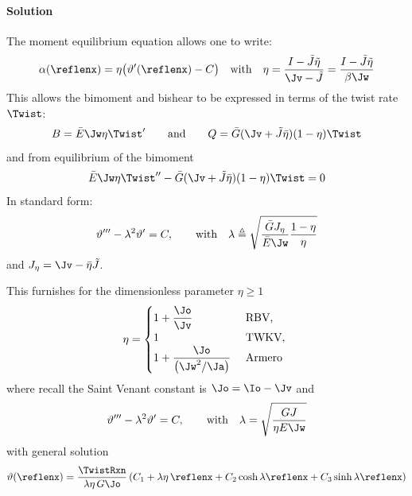 \paragraph{Solution}
The moment equilibrium equation allows one to write:
\begin{equation*}
    \alpha (\reflenx)= \eta \bigl(
     \vartheta^{\prime}(\reflenx) - C\bigr)
     \quad\text{with}\quad 
     \eta = \frac{I - \tilde{J}\tilde{\eta}}{\Jv - \tilde{J}} = \frac{I - \tilde{J}\tilde{\eta}}{\beta \Jw}
\end{equation*}
This allows the bimoment and bishear to be expressed in terms of the twist rate \(\Twist\):
\begin{equation*}
B = \bar{E}\Jw \eta \Twist' 
\qquad\text{and}\qquad
Q = \bar{G}(\Jv + \tilde{J}\bar{\eta})(1 - \eta) \Twist
\end{equation*}
and from equilibrium of the bimoment
\begin{equation}
\bar{E}\Jw \eta \Twist'' - \bar{G}(\Jv + \tilde{J}\bar{\eta})(1 - \eta) \Twist = 0
\end{equation}
%
In standard form:
\begin{equation*}
\vartheta''' - \lambda^2 \vartheta' = C,
\qquad\text{with}\quad
\lambda \triangleq \sqrt{\frac{\bar{G}J_{\eta}}{\bar{E}\Jw}\frac{1 - \eta}{\eta}}
\end{equation*}
and \(J_{\eta} = \Jv - \bar{\eta}\tilde{J}\). 
%


This furnishes for the dimensionless parameter $\eta \geq 1$ \citep{armero2022newa}
\begin{equation}
\eta = \begin{cases}
1+\dfrac{\Jo}{\Jv} & \text { RBV, } \\
1 & \text { TWKV, } \\ 
1+\dfrac{\Jo}{\left(\Jw^2 / \Ja \right)} & \text { Armero}\end{cases}
\end{equation}
where recall the Saint Venant constant is \(\Jo = \Io - \Jv\)
and
$$
\vartheta''' - \lambda^2 \vartheta' = C,
\qquad\text{with}\quad
\lambda = \sqrt{\frac{GJ}{\eta E\Jw}}
$$
with general solution
\begin{equation}
\begin{aligned}
\vartheta(\reflenx)= \frac{\TwistRxn}{\lambda \eta \, G\Jo}\left(
 C_1 + \lambda\eta \, \reflenx +  C_2 \cosh \lambda \reflenx + C_3 \sinh \lambda \reflenx
\right)
\end{aligned}
\label{eq:0028-gen-rot}
\end{equation}